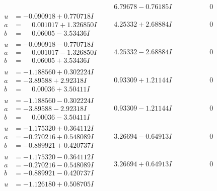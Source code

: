 \documentclass[1p]{elsarticle_modified}
\theoremstyle{definition}
\begin{document}
$$\begin{array}{c|c|c}
 & \phantom{-}6.79678 - 0.76185 I & \phantom{-0.000000 } 0 \\ \hline\begin{aligned}
u &= -0.090918 + 0.770718 I \\
a &= \phantom{-}0.001017 + 1.326850 I \\
b &= \phantom{-}0.06005 - 3.53436 I\end{aligned}
 & \phantom{-}4.25332 + 2.68884 I & \phantom{-0.000000 } 0 \\ \hline\begin{aligned}
u &= -0.090918 - 0.770718 I \\
a &= \phantom{-}0.001017 - 1.326850 I \\
b &= \phantom{-}0.06005 + 3.53436 I\end{aligned}
 & \phantom{-}4.25332 - 2.68884 I & \phantom{-0.000000 } 0 \\ \hline\begin{aligned}
u &= -1.188560 + 0.302224 I \\
a &= -3.89588 + 2.92318 I \\
b &= \phantom{-}0.00036 + 3.50411 I\end{aligned}
 & \phantom{-}0.93309 + 1.21144 I & \phantom{-0.000000 } 0 \\ \hline\begin{aligned}
u &= -1.188560 - 0.302224 I \\
a &= -3.89588 - 2.92318 I \\
b &= \phantom{-}0.00036 - 3.50411 I\end{aligned}
 & \phantom{-}0.93309 - 1.21144 I & \phantom{-0.000000 } 0 \\ \hline\begin{aligned}
u &= -1.175320 + 0.364112 I \\
a &= -0.270216 + 0.548089 I \\
b &= -0.889921 + 0.420737 I\end{aligned}
 & \phantom{-}3.26694 - 0.64913 I & \phantom{-0.000000 } 0 \\ \hline\begin{aligned}
u &= -1.175320 - 0.364112 I \\
a &= -0.270216 - 0.548089 I \\
b &= -0.889921 - 0.420737 I\end{aligned}
 & \phantom{-}3.26694 + 0.64913 I & \phantom{-0.000000 } 0 \\ \hline\begin{aligned}
u &= -1.126180 + 0.508705 I \\

\end{aligned}
\end{array}$$
\end{document}

